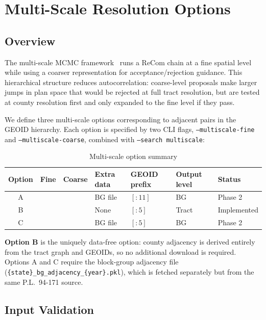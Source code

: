 \section{Multi-Scale Resolution Options}
\label{sec:options}

\subsection{Overview}

The multi-scale MCMC framework~\citep{autry2021multiscale} runs a ReCom chain
at a fine spatial level while using a coarser representation for
acceptance/rejection guidance.
This hierarchical structure reduces autocorrelation: coarse-level proposals
make larger jumps in plan space that would be rejected at full tract
resolution, but are tested at county resolution first and only expanded to
the fine level if they pass.

We define three multi-scale options corresponding to adjacent pairs in the
GEOID hierarchy.
Each option is specified by two CLI flags,
\texttt{--multiscale-fine} and \texttt{--multiscale-coarse},
combined with \texttt{--search multiscale}:

\begin{table}[h]
\centering
\caption{Multi-scale option summary}
\label{tab:options}
\begin{tabular}{cllllll}
\toprule
Option & Fine & Coarse & Extra data & GEOID prefix & Output level & Status \\
\midrule
A & \bg{}   & \tract{}  & BG file    & $[:11]$      & BG           & Phase 2 \\
B & \tract{} & \county{} & None       & $[:5]$       & Tract        & Implemented \\
C & \bg{}   & \county{} & BG file    & $[:5]$       & BG           & Phase 2 \\
\bottomrule
\end{tabular}
\end{table}

\noindent
\textbf{Option B} is the uniquely data-free option: county adjacency is
derived entirely from the tract graph and GEOIDs, so no additional download
is required.
Options A and C require the block-group adjacency file
(\texttt{\{state\}\_bg\_adjacency\_\{year\}.pkl}),
which is fetched separately but from the same P.L.\ 94-171 source.

\subsection{Input Validation}

